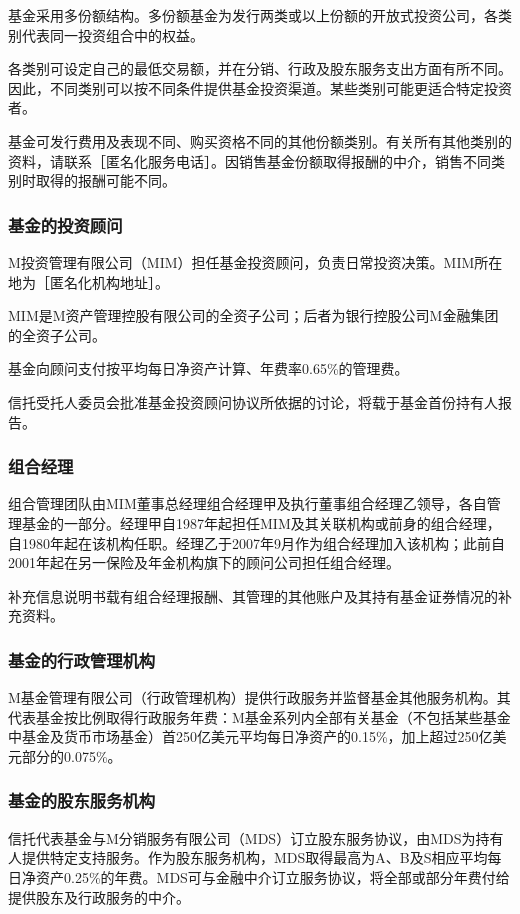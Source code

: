 \documentclass[UTF8,fontset=none,11pt,a4paper]{ctexart}
\begin{document}
基金采用多份额结构。多份额基金为发行两类或以上份额的开放式投资公司，各类别代表同一投资组合中的权益。

各类别可设定自己的最低交易额，并在分销、行政及股东服务支出方面有所不同。因此，不同类别可以按不同条件提供基金投资渠道。某些类别可能更适合特定投资者。

基金可发行费用及表现不同、购买资格不同的其他份额类别。有关所有其他类别的资料，请联系［匿名化服务电话］。因销售基金份额取得报酬的中介，销售不同类别时取得的报酬可能不同。

\subsubsection*{基金的投资顾问}
M投资管理有限公司（MIM）担任基金投资顾问，负责日常投资决策。MIM所在地为［匿名化机构地址］。

MIM是M资产管理控股有限公司的全资子公司；后者为银行控股公司M金融集团的全资子公司。

基金向顾问支付按平均每日净资产计算、年费率0.65\%的管理费。

信托受托人委员会批准基金投资顾问协议所依据的讨论，将载于基金首份持有人报告。

\subsubsection*{组合经理}
组合管理团队由MIM董事总经理组合经理甲及执行董事组合经理乙领导，各自管理基金的一部分。经理甲自1987年起担任MIM及其关联机构或前身的组合经理，自1980年起在该机构任职。经理乙于2007年9月作为组合经理加入该机构；此前自2001年起在另一保险及年金机构旗下的顾问公司担任组合经理。

补充信息说明书载有组合经理报酬、其管理的其他账户及其持有基金证券情况的补充资料。

\subsubsection*{基金的行政管理机构}
M基金管理有限公司（行政管理机构）提供行政服务并监督基金其他服务机构。其代表基金按比例取得行政服务年费：M基金系列内全部有关基金（不包括某些基金中基金及货币市场基金）首250亿美元平均每日净资产的0.15\%，加上超过250亿美元部分的0.075\%。

\subsubsection*{基金的股东服务机构}
信托代表基金与M分销服务有限公司（MDS）订立股东服务协议，由MDS为持有人提供特定支持服务。作为股东服务机构，MDS取得最高为A、B及S相应平均每日净资产0.25\%的年费。MDS可与金融中介订立服务协议，将全部或部分年费付给提供股东及行政服务的中介。
\end{document}
